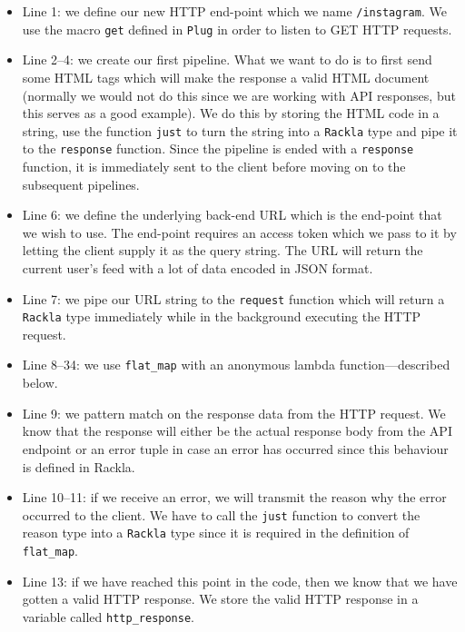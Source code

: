 \documentclass{cslthse-msc}
\begin{document}
\begin{itemize}

\item Line 1: we define our new HTTP end-point which we name \lstinline{/instagram}. We use the macro \lstinline{get} defined in \lstinline{Plug} in order to listen to GET HTTP requests.

\item Line 2--4: we create our first pipeline. What we want to do is to first send some HTML tags which will make the response a valid HTML document (normally we would not do this since we are working with API responses, but this serves as a good example). We do this by storing the HTML code in a string, use the function \lstinline{just} to turn the string into a \lstinline{Rackla} type and pipe it to the \lstinline{response} function. Since the pipeline is ended with a \lstinline{response} function, it is immediately sent to the client before moving on to the subsequent pipelines.

\item Line 6: we define the underlying back-end URL which is the end-point that we wish to use. The end-point requires an access token which we pass to it by letting the client supply it as the query string. The URL will return the current user's feed with a lot of data encoded in JSON format.

\item Line 7: we pipe our URL string to the \lstinline{request} function which will return a \lstinline{Rackla} type immediately while in the background executing the HTTP request.

\item Line 8--34: we use \lstinline{flat_map} with an anonymous lambda function---described below.

\item Line 9: we pattern match on the response data from the HTTP request. We know that the response will either be the actual response body from the API endpoint or an error tuple in case an error has occurred since this behaviour is defined in Rackla.

\item Line 10--11: if we receive an error, we will transmit the reason why the error occurred to the client. We have to call the \lstinline{just} function to convert the reason type into a \lstinline{Rackla} type since it is required in the definition of \lstinline{flat_map}.

\item Line 13: if we have reached this point in the code, then we know that we have gotten a valid HTTP response. We store the valid HTTP response in a variable called \lstinline{http_response}.


\end{itemize}
\end{document}
